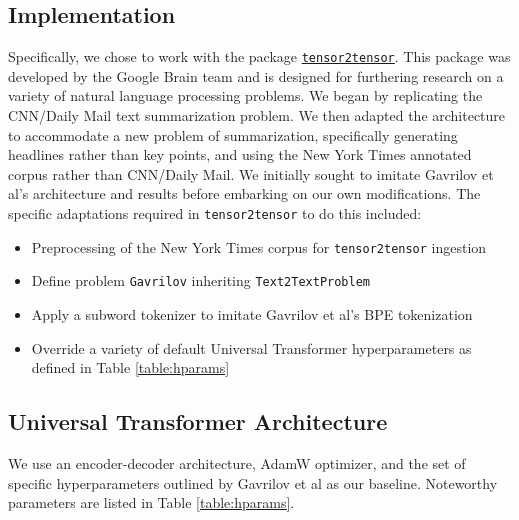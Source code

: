 \documentclass[11pt]{article}
\begin{document}
\subsection{Implementation}
Specifically, we chose to work with the package \href{https://github.com/tensorflow/tensor2tensor}{\texttt{tensor2tensor}}. This package was developed by the Google Brain team and is designed for furthering research on a variety of natural language processing problems\cite{vaswani-etal-2018-tensor2tensor}. We began by replicating the CNN/Daily Mail text summarization problem. We then adapted the architecture to accommodate a new problem of summarization, specifically generating headlines rather than key points, and using the New York Times annotated corpus rather than CNN/Daily Mail. We initially sought to imitate Gavrilov et al's architecture and results before embarking on our own modifications. The specific adaptations required in \texttt{tensor2tensor} to do this included:

\begin{itemize}
    \item Preprocessing of the New York Times corpus for \texttt{tensor2tensor} ingestion
    \item Define problem \texttt{Gavrilov} inheriting \texttt{Text2TextProblem}
    \item Apply a subword tokenizer to imitate Gavrilov et al's BPE tokenization
    \item Override a variety of default Universal Transformer hyperparameters as defined in Table \ref{table:hparams}
\end{itemize}

\subsection{Universal Transformer Architecture}
We use an encoder-decoder architecture, AdamW optimizer, and the set of specific hyperparameters outlined by Gavrilov et al \cite{DBLP:journals/corr/abs-1901-07786} as our baseline. Noteworthy parameters are listed in Table \ref{table:hparams}.
\end{document}
